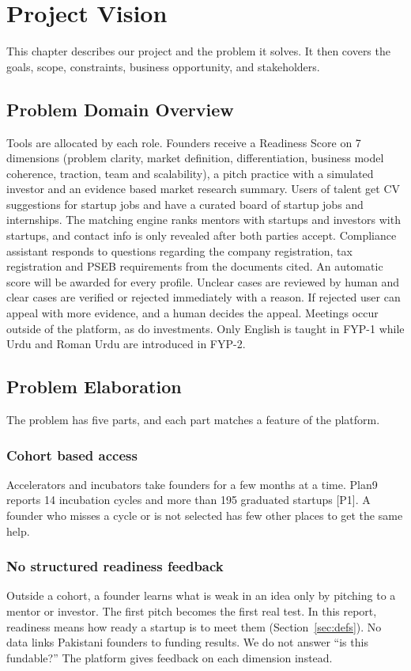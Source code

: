 \documentclass{FastFyp}
\newcommand{\src}[1]{[#1]}
\begin{document}
\chapter{Project Vision}
This chapter describes our project and the problem it solves. It then covers the goals, scope, constraints, business opportunity, and stakeholders.

\section{Problem Domain Overview}
Tools are allocated by each role. Founders receive a Readiness Score on 7 dimensions (problem clarity, market definition, differentiation, business model coherence, traction, team and scalability), a pitch practice with a simulated investor and an evidence based market research summary. Users of talent get CV suggestions for startup jobs and have a curated board of startup jobs and internships. The matching engine ranks mentors with startups and investors with startups, and contact info is only revealed after both parties accept. Compliance assistant responds to questions regarding the company registration, tax registration and PSEB requirements from the documents cited. An automatic score will be awarded for every profile. Unclear cases are reviewed by human and clear cases are verified or rejected immediately with a reason. If rejected user can appeal with more evidence, and a human decides the appeal. Meetings occur outside of the platform, as do investments. Only English is taught in FYP-1 while Urdu and Roman Urdu are introduced in FYP-2.

\section{Problem Elaboration}
The problem has five parts, and each part matches a feature of the platform.

\subsection{Cohort based access}
Accelerators and incubators take founders for a few months at a time. Plan9 reports 14 incubation cycles and more than 195 graduated startups \src{P1}. A founder who misses a cycle or is not selected has few other places to get the same help.

\subsection{No structured readiness feedback}
Outside a cohort, a founder learns what is weak in an idea only by pitching to a mentor or investor. The first pitch becomes the first real test. In this report, readiness means how ready a startup is to meet them (Section~\ref{sec:defs}). No data links Pakistani founders to funding results. We do not answer ``is this fundable?'' The platform gives feedback on each dimension instead.
\end{document}
